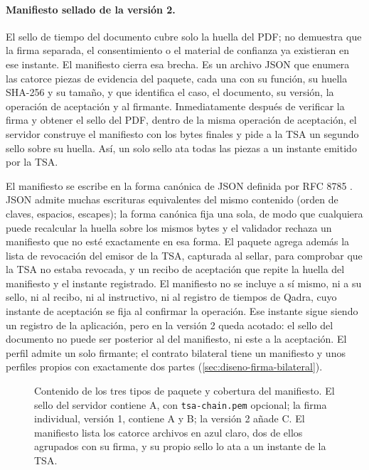 \paragraph{Manifiesto sellado de la versión 2.} El sello de tiempo del documento cubre solo la huella del PDF; no demuestra que la firma separada, el consentimiento o el material de confianza ya existieran en ese instante. El manifiesto cierra esa brecha. Es un archivo JSON que enumera las catorce piezas de evidencia del paquete, cada una con su función, su huella SHA-256 y su tamaño, y que identifica el caso, el documento, su versión, la operación de aceptación y al firmante. Inmediatamente después de verificar la firma y obtener el sello del PDF, dentro de la misma operación de aceptación, el servidor construye el manifiesto con los bytes finales y pide a la TSA un segundo sello sobre su huella. Así, un solo sello ata todas las piezas a un instante emitido por la TSA.

El manifiesto se escribe en la forma canónica de JSON definida por RFC 8785 \cite{rundgren2020}. JSON admite muchas escrituras equivalentes del mismo contenido (orden de claves, espacios, escapes); la forma canónica fija una sola, de modo que cualquiera puede recalcular la huella sobre los mismos bytes y el validador rechaza un manifiesto que no esté exactamente en esa forma. El paquete agrega además la lista de revocación del emisor de la TSA, capturada al sellar, para comprobar que la TSA no estaba revocada, y un recibo de aceptación que repite la huella del manifiesto y el instante registrado. El manifiesto no se incluye a sí mismo, ni a su sello, ni al recibo, ni al instructivo, ni al registro de tiempos de Qadra, cuyo instante de aceptación se fija al confirmar la operación. Ese instante sigue siendo un registro de la aplicación, pero en la versión 2 queda acotado: el sello del documento no puede ser posterior al del manifiesto, ni este a la aceptación. El perfil admite un solo firmante; el contrato bilateral tiene un manifiesto y unos perfiles propios con exactamente dos partes (\cref{sec:diseno-firma-bilateral}).

\begin{figure}[!htbp]
  \centering
  
  \caption{Contenido de los tres tipos de paquete y cobertura del manifiesto. El sello del servidor contiene A, con \texttt{tsa-chain.pem} opcional; la firma individual, versión 1, contiene A y B; la versión 2 añade C. El manifiesto lista los catorce archivos en azul claro, dos de ellos agrupados con su firma, y su propio sello lo ata a un instante de la TSA.}
  \label{fig:cripto-manifiesto}
\end{figure}

